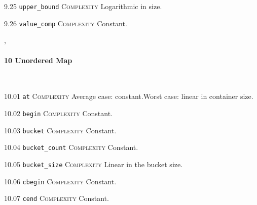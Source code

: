 \noindent\textcolor{clime}{9.25 \texttt{upper\_bound}} \textsc{Complexity} Logarithmic in size. \vspace{0.5em}

\noindent\textcolor{cgreen}{9.26 \texttt{value\_comp}} \textsc{Complexity} Constant. \vspace{0.5em}


\sep
{}
\paragraph{10 Unordered Map}\mbox{}\\
\noindent\textcolor{corange}{10.01 \texttt{at}} \textsc{Complexity} Average case: constant.Worst case: linear in container size. \vspace{0.5em}

\noindent\textcolor{cgreen}{10.02 \texttt{begin}} \textsc{Complexity} Constant. \vspace{0.5em}

\noindent\textcolor{cgreen}{10.03 \texttt{bucket}} \textsc{Complexity} Constant. \vspace{0.5em}

\noindent\textcolor{cgreen}{10.04 \texttt{bucket\_count}} \textsc{Complexity} Constant. \vspace{0.5em}

\noindent\textcolor{corange}{10.05 \texttt{bucket\_size}} \textsc{Complexity} Linear in the bucket size. \vspace{0.5em}

\noindent\textcolor{cgreen}{10.06 \texttt{cbegin}} \textsc{Complexity} Constant. \vspace{0.5em}

\noindent\textcolor{cgreen}{10.07 \texttt{cend}} \textsc{Complexity} Constant. \vspace{0.5em}

